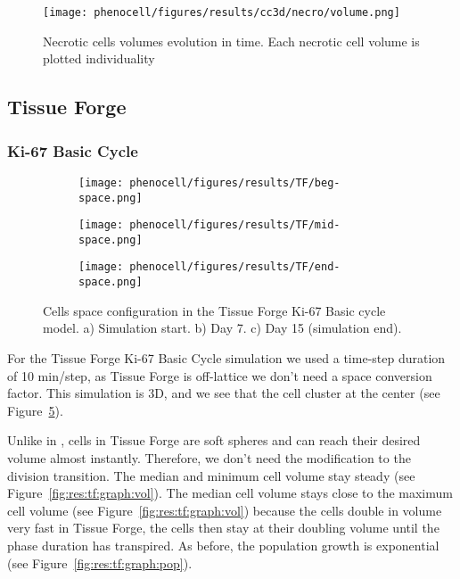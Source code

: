 \begin{figure}[!htbp]
    \centering
    \texttt{[image: phenocell/figures/results/cc3d/necro/volume.png]}
    \caption{Necrotic cells volumes evolution in time. Each necrotic cell volume is plotted individuality}
    \label{fig:res:cc3d:necro:graph}
\end{figure}

\subsection{Tissue Forge}\label{sec:res:tf}



\subsubsection{Ki-67 Basic Cycle}\label{sec:res:tf:ki67}

\begin{figure}[!htbp]
    \centering
    \begin{subfigure}{.32\textwidth}
        \texttt{[image: phenocell/figures/results/TF/beg-space.png]}
        \caption{}\label{fig:res:tf:space:beg}
    \end{subfigure}
    \begin{subfigure}{.32\textwidth}
        \texttt{[image: phenocell/figures/results/TF/mid-space.png]}
        \caption{}\label{fig:res:tf:space:mid}
    \end{subfigure}
    \begin{subfigure}{.32\textwidth}
        \texttt{[image: phenocell/figures/results/TF/end-space.png]}
        \caption{}\label{fig:res:tf:space:end}
    \end{subfigure}
    \caption{Cells space configuration in the Tissue Forge Ki-67 Basic cycle model. a) Simulation start. b) Day 7. c) Day 15 (simulation end).}
    \label{fig:res:tf:space}
\end{figure}

For the Tissue Forge Ki-67 Basic Cycle simulation we used a time-step duration of 10 min/step, as Tissue Forge is off-lattice we don't need a space conversion factor. This simulation is 3D, and we see that the cell cluster at the center (see Figure~\ref{fig:res:tf:space}).

Unlike in \ccds, cells in Tissue Forge are soft spheres and can reach their desired volume almost instantly. Therefore, we don't need the modification to the division transition. The median and minimum cell volume stay steady (see Figure~\ref{fig:res:tf:graph:vol}). The median cell volume stays close to the maximum cell volume (see Figure~\ref{fig:res:tf:graph:vol}) because the cells double in volume very fast in Tissue Forge, the cells then stay at their doubling volume until the phase duration has transpired. As before, the population growth is exponential (see Figure~\ref{fig:res:tf:graph:pop}).

